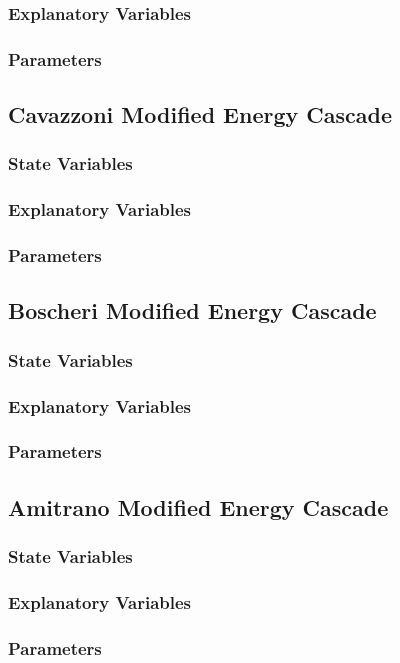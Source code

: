 \documentclass{article}
\begin{document}
\subsubsection{Explanatory Variables}
\subsubsection{Parameters}
\subsection{Cavazzoni Modified Energy Cascade}
\subsubsection{State Variables}
\subsubsection{Explanatory Variables}
\subsubsection{Parameters}

\subsection{Boscheri Modified Energy Cascade}
\subsubsection{State Variables}
\subsubsection{Explanatory Variables}
\subsubsection{Parameters}

\subsection{Amitrano Modified Energy Cascade}
\subsubsection{State Variables}
\subsubsection{Explanatory Variables}
\subsubsection{Parameters}
\end{document}
